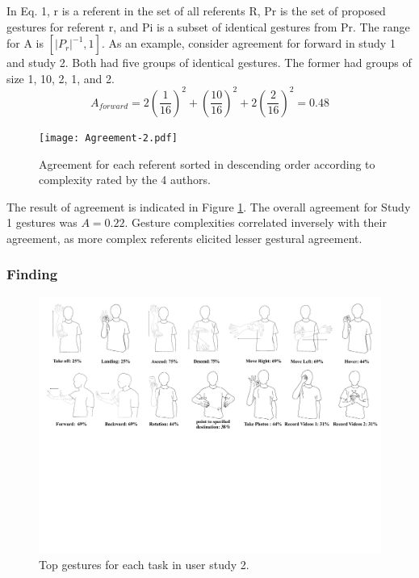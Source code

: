 \documentclass{sigchi}
\begin{document}
In Eq. 1, r is a referent in the set of all referents R, Pr is the set of proposed gestures for referent r, and Pi is a subset of identical gestures from Pr. The range for A is $\left[\lvert{P_r}\rvert ^{-1}, 1\right]$. As an example, consider agreement for forward in study 1 and study 2. Both had five groups of identical gestures. The former had groups of size 1, 10, 2, 1, and 2.
\begin{equation}
   A_{forward} = 2\left(\frac{1}{16}\right) ^ 2  + \left(\frac{10}{16}\right) ^ 2 + 2\left(\frac{2}{16}\right) ^ 2 = 0.48
\end{equation}



\begin{figure}[!h]
\centering
\texttt{[image: Agreement-2.pdf]}
\caption{Agreement for each referent sorted in descending order according to complexity rated by the 4 authors.}
\label{fig:agreementFigure}
\end{figure}

The result of agreement is indicated in Figure \ref{fig:agreementFigure}. The overall agreement for Study 1 gestures was $A=0.22$. Gesture complexities correlated inversely with their agreement, as more complex referents elicited lesser gestural agreement.

\subsubsection{Finding}

\begin{figure}
  \centering
  \includegraphics[width=1\textwidth]{GestureSetFigure1.pdf}
  \caption{Top gestures for each task in user study 2.}
  \label{fig:GestureSetFigure}
  \end{figure}
\end{document}
